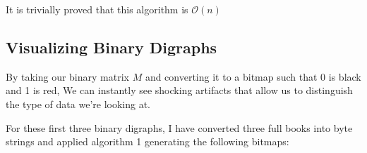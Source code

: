 \documentclass[12pt,a4paper]{article}
\begin{document}
It is trivially proved that this algorithm is $\mathcal{O}(n)$ 

\subsection{Visualizing Binary Digraphs}
By taking our binary matrix $M$ and converting it to a bitmap such that 0 is black and 1 is red, We can instantly see shocking artifacts that allow us to distinguish the type of data we're looking at.

For these first three binary digraphs, I have converted three full books into byte strings and applied algorithm 1 generating the following bitmaps:

\begin{figure}[!h]
    \centering
\end{figure}
\end{document}

